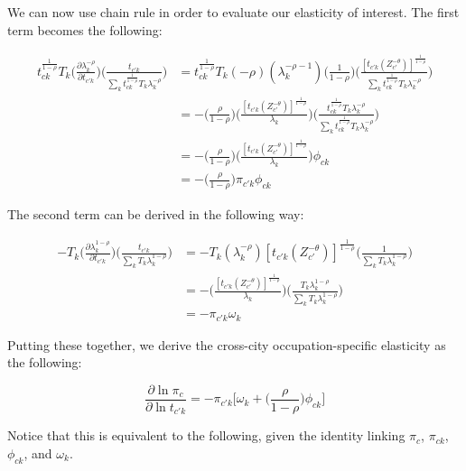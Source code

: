 \documentclass[10pt]{article}
\begin{document}
We can now use chain rule in order to evaluate our elasticity of interest. The first term becomes the following:

\begin{align*}
    {t^{\frac{1}{1-\rho}}_{ck}}{T_{k}}\Big(\frac{\partial\lambda_{k}^{-\rho}}{\partial{t_{{c'}k}}}\Big)\Big(\frac{t_{{c'}k}}{{\sum\limits_{k}{t^{\frac{1}{1-\rho}}_{ck}}{T_{k}}\lambda_{k}^{-\rho}}}\Big) & = {t^{\frac{1}{1-\rho}}_{ck}}{T_{k}}(-\rho)(\lambda_{k}^{-\rho-1})\Big(\frac{1}{1-\rho}\Big)\Bigg(\frac{[{t_{{c'}k}}(Z_{c'}^{-\theta})]^{\frac{1}{1-\rho}}}{{\sum\limits_{k}{t^{\frac{1}{1-\rho}}_{ck}}{T_{k}}\lambda_{k}^{-\rho}}}\Bigg) \\ &= -\Bigg(\frac{\rho}{1-\rho}\Bigg)\Bigg(\frac{[{t_{{c'}k}}(Z_{c'}^{-\theta})]^{\frac{1}{1-\rho}}}{\lambda_{k}}\Bigg)\Bigg(\frac{t^{\frac{1}{1-\rho}}_{ck}{T_{k}}{\lambda^{-\rho}_{k}}}{{\sum\limits_{k}{t^{\frac{1}{1-\rho}}_{ck}}{T_{k}}\lambda_{k}^{-\rho}}}\Bigg)\\ &= -\Bigg(\frac{\rho}{1-\rho}\Bigg)\Bigg(\frac{[{t_{{c'}k}}(Z_{c'}^{-\theta})]^{\frac{1}{1-\rho}}}{\lambda_{k}}\Bigg){\phi_{ck}}\\ &= -\Big(\frac{\rho}{1-\rho}\Big){\pi_{{c'}k}}{\phi_{ck}}
\end{align*}

The second term can be derived in the following way:

\begin{align*}
    - {T_{k}}\Big(\frac{\partial\lambda_{k}^{1-\rho}}{\partial{t_{{c'}k}}}\Big)\Big(\frac{t_{{c'}k}}{{\sum\limits_{k}{T_{k}}\lambda_{k}^{1-\rho}}}\Big) & = - {T_{k}}(\lambda_{k}^{-\rho})[{t_{{c'}k}}(Z_{c'}^{-\theta})]^{\frac{1}{1-\rho}}\Big(\frac{1}{{\sum\limits_{k}{T_{k}}\lambda_{k}^{1-\rho}}}\Big) \\ &= - \Bigg(\frac{[{t_{{c'}k}}(Z_{c'}^{-\theta})]^{\frac{1}{1-\rho}}}{\lambda_{k}}\Bigg)\Big(\frac{{T_{k}}{\lambda_{k}^{1-\rho}}}{{\sum\limits_{k} T_k \lambda_{k}^{1-\rho}}}\Big)\\ &= -\pi_{{c'}k}{\omega_{k}}
\end{align*}

Putting these together, we derive the cross-city occupation-specific elasticity as the following:

\begin{equation*}
    \frac{\partial\ln{\pi_{c}}}{\partial\ln{t_{{c'}k}}} = -{\pi_{{c'}k}}\Big[\omega_{k}+\Big(\frac{\rho}{1-\rho}\Big)\phi_{ck}]
\end{equation*}

Notice that this is equivalent to the following, given the identity linking $\pi_{c}$, $\pi_{ck}$, $\phi_{ck}$, and $\omega_{k}$.
\end{document}
